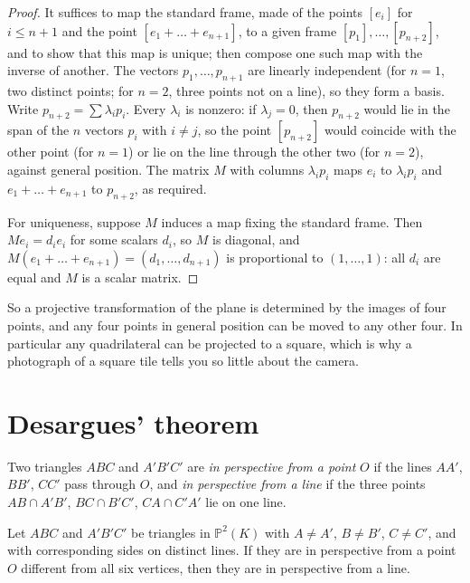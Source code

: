 \begin{proof}
It suffices to map the standard frame, made of the points $[e_i]$ for $i\le n+1$ and the point $[e_1+\dots+e_{n+1}]$, to a given frame
$[p_1],\dots,[p_{n+2}]$, and to show that this map is unique; then compose one such map with the inverse of another. The vectors
$p_1,\dots,p_{n+1}$ are linearly independent (for $n=1$, two distinct points; for $n=2$, three points not on a line), so they form a basis. Write
$p_{n+2}=\sum\lambda_ip_i$. Every $\lambda_i$ is nonzero: if $\lambda_j=0$, then $p_{n+2}$ would lie in the span of the $n$ vectors $p_i$ with
$i\ne j$, so the point $[p_{n+2}]$ would coincide with the other point (for $n=1$) or lie on the line through the other two (for $n=2$), against
general position. The matrix $M$ with columns $\lambda_ip_i$ maps
$e_i$ to $\lambda_ip_i$ and $e_1+\dots+e_{n+1}$ to $p_{n+2}$, as required.

For uniqueness, suppose $M$ induces a map fixing the standard frame. Then $Me_i=d_ie_i$ for some scalars $d_i$, so $M$ is diagonal, and
$M(e_1+\dots+e_{n+1})=(d_1,\dots,d_{n+1})$ is proportional to $(1,\dots,1)$: all $d_i$ are equal and $M$ is a scalar matrix.
\end{proof}

So a projective transformation of the plane is determined by the images of four points, and any four points in general position can be moved
to any other four. In particular any quadrilateral can be projected to a square, which is why a photograph of a square tile tells you so
little about the camera.

\section{Desargues' theorem}

Two triangles $ABC$ and $A'B'C'$ are \emph{in perspective from a point} $O$ if the lines $AA'$, $BB'$, $CC'$ pass through $O$, and \emph{in
perspective from a line} if the three points $AB\cap A'B'$, $BC\cap B'C'$, $CA\cap C'A'$ lie on one line.

\begin{theorem}[Desargues]\label{geometry:thm:desargues}
Let $ABC$ and $A'B'C'$ be triangles in $\mathbb P^2(K)$ with $A\ne A'$, $B\ne B'$, $C\ne C'$, and with corresponding sides on distinct lines. If
they are in perspective from a point $O$ different from all six vertices, then they are in perspective from a line.
\end{theorem}

